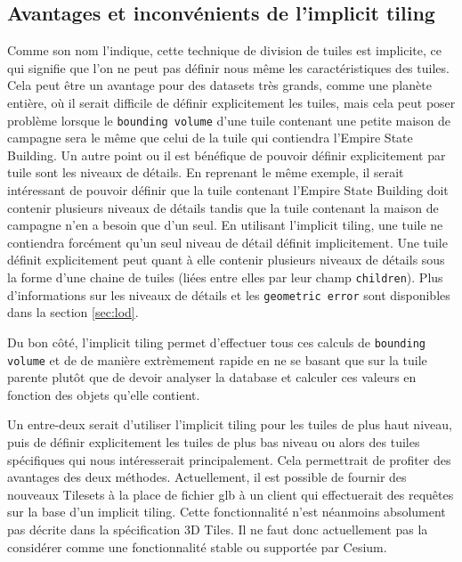\subsection{Avantages et inconvénients de l'implicit tiling}

Comme son nom l'indique, cette technique de division de tuiles est implicite, ce qui signifie que l'on ne peut pas définir nous même les caractéristiques des tuiles. Cela peut être un avantage pour des datasets très grands, comme une planète entière, où il serait difficile de définir explicitement les tuiles, mais cela peut poser problème lorsque le \texttt{bounding volume} d'une tuile contenant une petite maison de campagne sera le même que celui de la tuile qui contiendra l'Empire State Building. Un autre point ou il est bénéfique de pouvoir définir explicitement par tuile sont les niveaux de détails. En reprenant le même exemple, il serait intéressant de pouvoir définir que la tuile contenant l'Empire State Building doit contenir plusieurs niveaux de détails tandis que la tuile contenant la maison de campagne n'en a besoin que d'un seul. En utilisant l'implicit tiling, une tuile ne contiendra forcément qu'un seul niveau de détail définit implicitement. Une tuile définit explicitement peut quant à elle contenir plusieurs niveaux de détails sous la forme d'une chaine de tuiles (liées entre elles par leur champ \texttt{children}). Plus d'informations sur les niveaux de détails et les \texttt{geometric error} sont disponibles dans la section \ref{sec:lod}.


Du bon côté, l'implicit tiling permet d'effectuer tous ces calculs de \texttt{bounding volume} et de  de manière extrèmement rapide en ne se basant que sur la tuile parente plutôt que de devoir analyser la database et calculer ces valeurs en fonction des objets qu'elle contient.

Un entre-deux serait d'utiliser l'implicit tiling pour les tuiles de plus haut niveau, puis de définir explicitement les tuiles de plus bas niveau ou alors des tuiles spécifiques qui nous intéresserait principalement. Cela permettrait de profiter des avantages des deux méthodes. Actuellement, il est possible de fournir des nouveaux Tilesets à la place de fichier glb à un client qui effectuerait des requêtes sur la base d'un implicit tiling. Cette fonctionnalité n'est néanmoins absolument pas décrite dans la spécification 3D Tiles. Il ne faut donc actuellement pas la considérer comme une fonctionnalité stable ou supportée par Cesium.

